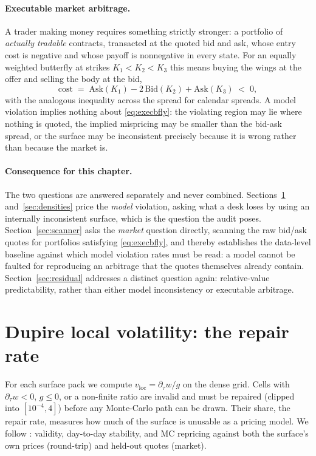 \paragraph{Executable market arbitrage.} A trader making money requires something strictly
stronger: a portfolio of \emph{actually tradable} contracts, transacted at the quoted bid and
ask, whose entry cost is negative and whose payoff is nonnegative in every state. For an equally
weighted butterfly at strikes $K_1<K_2<K_3$ this means buying the wings at the offer and selling
the body at the bid,
\begin{equation}\label{eq:execbfly}
\mathrm{cost}\;=\;\mathrm{Ask}(K_1)-2\,\mathrm{Bid}(K_2)+\mathrm{Ask}(K_3)\;<\;0,
\end{equation}
with the analogous inequality across the spread for calendar spreads. A model violation implies
nothing about \eqref{eq:execbfly}: the violating region may lie where nothing is quoted, the
implied mispricing may be smaller than the bid-ask spread, or the surface may be inconsistent
precisely because it is wrong rather than because the market is.

\paragraph{Consequence for this chapter.} The two questions are answered separately and never
combined. Sections~\ref{sec:localvol} and~\ref{sec:densities} price the \emph{model} violation,
asking what a desk loses by using an internally inconsistent surface, which is the question the
audit poses. Section~\ref{sec:scanner} asks the \emph{market} question directly, scanning the
raw bid/ask quotes for portfolios satisfying \eqref{eq:execbfly}, and thereby establishes the
data-level baseline against which model violation rates must be read: a model cannot be faulted
for reproducing an arbitrage that the quotes themselves already contain.
Section~\ref{sec:residual} addresses a distinct question again: relative-value predictability,
rather than either model inconsistency or executable arbitrage.

\section{Dupire local volatility: the repair rate}\label{sec:localvol}

For each surface pack we compute $v_{\mathrm{loc}}=\partial_\tau w/g$ on the dense grid. Cells
with $\partial_\tau w<0$, $g\le0$, or a non-finite ratio are invalid and must be repaired
(clipped into $[10^{-4},4]$) before any Monte-Carlo path can be drawn. Their share, the repair
rate, measures how much of the surface is unusable as a pricing model. We follow
\cite[\S7]{chataigner2020}: validity, day-to-day stability, and MC repricing against both the
surface's own prices (round-trip) and held-out quotes (market).

